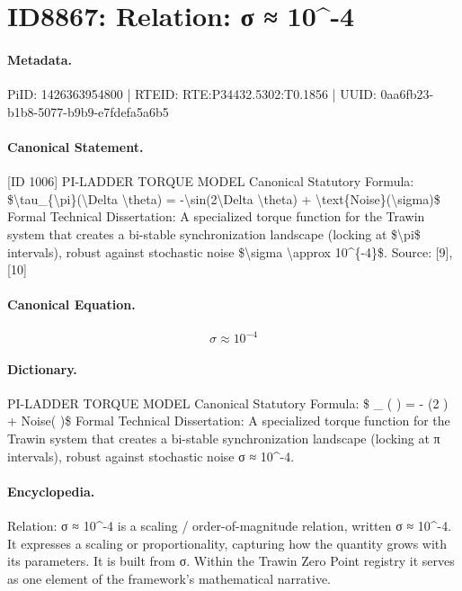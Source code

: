 \section*{ID8867: Relation: σ ≈ 10\textasciicircum{}-4}
\paragraph{Metadata.}
PiID: 1426363954800 | RTEID: RTE:P34432.5302:T0.1856 | UUID: 0aa6fb23-b1b8-5077-b9b9-e7fdefa5a6b5

\paragraph{Canonical Statement.}
[ID 1006] PI-LADDER TORQUE MODEL Canonical Statutory Formula: \$\textbackslash{}tau\_\{\textbackslash{}pi\}(\textbackslash{}Delta \textbackslash{}theta) = -\textbackslash{}sin(2\textbackslash{}Delta \textbackslash{}theta) + \textbackslash{}text\{Noise\}(\textbackslash{}sigma)\$ Formal Technical Dissertation: A specialized torque function for the Trawin system that creates a bi-stable synchronization landscape (locking at \$\textbackslash{}pi\$ intervals), robust against stochastic noise \$\textbackslash{}sigma \textbackslash{}approx 10\textasciicircum{}\{-4\}\$. Source: [9], [10]

\paragraph{Canonical Equation.}
\[
\sigma \approx 10^{-4}
\]

\paragraph{Dictionary.}
PI-LADDER TORQUE MODEL Canonical Statutory Formula: \$ \_ ( ) = - (2 ) + Noise( )\$ Formal Technical Dissertation: A specialized torque function for the Trawin system that creates a bi-stable synchronization landscape (locking at π intervals), robust against stochastic noise σ ≈ 10\textasciicircum{}-4.

\paragraph{Encyclopedia.}
Relation: σ ≈ 10\textasciicircum{}-4 is a scaling / order-of-magnitude relation, written σ ≈ 10\textasciicircum{}-4. It expresses a scaling or proportionality, capturing how the quantity grows with its parameters. It is built from σ. Within the Trawin Zero Point registry it serves as one element of the framework's mathematical narrative.
